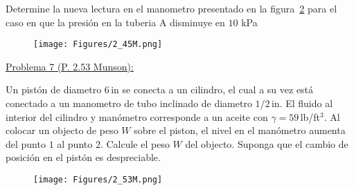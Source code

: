 \documentclass[11pt]{report}
\begin{document}
Determine la nueva lectura en el manometro presentado en la figura~\ref{fig:fig6} para el caso en que la presi\'on en la tuberia A disminuye en $10$ kPa

\begin{figure}[H]
\centering\texttt{[image: Figures/2\_45M.png]}
\caption{\label{fig:fig6} }
\end{figure}

\newpage

\vspace{0.5cm}
\underline {Problema 7 (P. 2.53 Munson):}
\vspace{0.2cm}

Un pist\'on de diametro $6$\,in se conecta a un cilindro, el cual a su vez est\'a conectado a un manometro de tubo inclinado de diametro $1/2$\,in. El fluido al interior del cilindro y man\'ometro corresponde a un aceite con $\gamma=59$\,lb/ft$^3$. Al colocar un objecto de peso $W$ sobre el piston, el nivel en el man\'ometro aumenta del punto $1$ al punto $2$. Calcule el peso $W$ del objecto. Suponga que el cambio de posici\'on en el pist\'on es despreciable.

\begin{figure}[H]
\centering\texttt{[image: Figures/2\_53M.png]}
\caption{\label{fig:fig6} }
\end{figure}
\end{document}
